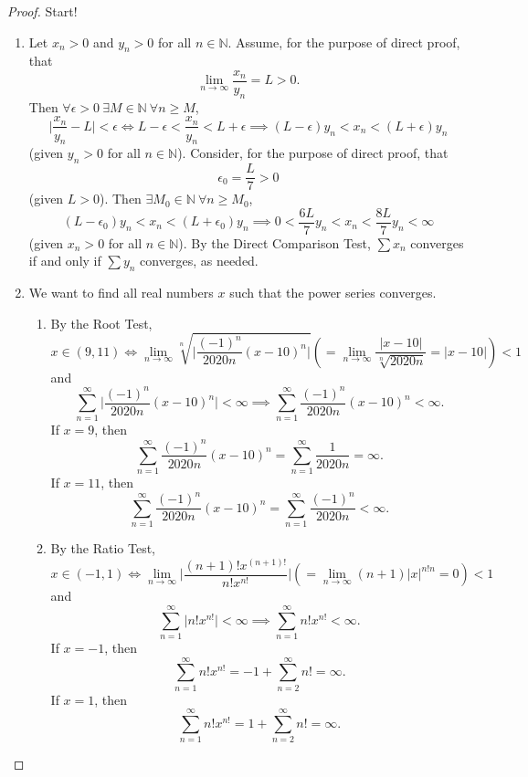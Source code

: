 \documentclass[12pt]{article}
\theoremstyle{definition}
\begin{document}
\begin{proof}
    Start!
    \begin{enumerate}[label=(\alph*)]
        \item Let \(x_n > 0\) and \(y_n > 0\) for all \(n \in \mathbb{N}\). Assume, for the purpose of direct proof, that
        \[
            \lim_{n \to \infty}\frac{x_n}{y_n} = L > 0.
        \]
        Then \(\forall \epsilon > 0 \ \exists M \in \mathbb{N} \ \forall n \geq M\),
        \[
            \bigg\vert \frac{x_n}{y_n} - L \bigg\vert < \epsilon \iff L - \epsilon < \frac{x_n}{y_n} < L + \epsilon \implies (L - \epsilon)y_n < x_n < (L + \epsilon)y_n
        \]
        (given \(y_n > 0\) for all \(n \in \mathbb{N}\)). Consider, for the purpose of direct proof, that
        \[
            \epsilon_0 = \frac{L}{7} > 0
        \]
        (given \(L > 0\)). Then \(\exists M_0 \in \mathbb{N} \ \forall n \geq M_0\),
        \[
            (L - \epsilon_0)y_n < x_n < (L + \epsilon_0)y_n \implies 0 < \frac{6L}{7}y_n < x_n < \frac{8L}{7}y_n < \infty
        \]
        (given \(x_n > 0\) for all \(n \in \mathbb{N}\)). By the Direct Comparison Test, \(\sum x_n\) converges if and only if \(\sum y_n\) converges, as needed.
        \item We want to find all real numbers \(x\) such that the power series converges.
        \begin{enumerate}[label=(\roman*)]
            \item By the Root Test,
            \[
                x \in (9,11) \iff \lim_{n \to \infty}\sqrt[n]{\bigg\vert \frac{(-1)^n}{2020n}(x - 10)^n \bigg\vert} \left( = \lim_{n \to \infty}\frac{\vert x - 10 \vert}{\sqrt[n]{2020n}} = \vert x - 10 \vert \right) < 1
            \]
            and
            \[
                \sum_{n = 1}^{\infty}\bigg\vert \frac{(-1)^n}{2020n}(x - 10)^n \bigg\vert < \infty \implies \sum_{n = 1}^{\infty}\frac{(-1)^n}{2020n}(x - 10)^n < \infty.
            \]
            If \(x = 9\), then
            \[
                \sum_{n = 1}^{\infty}\frac{(-1)^n}{2020n}(x - 10)^n = \sum_{n = 1}^{\infty}\frac{1}{2020n} = \infty.
            \]
            If \(x = 11\), then
            \[
                \sum_{n = 1}^{\infty}\frac{(-1)^n}{2020n}(x - 10)^n = \sum_{n = 1}^{\infty}\frac{(-1)^n}{2020n} < \infty.
            \]
            \item By the Ratio Test,
            \[
                x \in (-1,1) \iff \lim_{n \to \infty}\bigg\vert \frac{(n +1)!x^{(n + 1)!}}{n!x^{n!}} \bigg\vert \left( = \lim_{n \to \infty}(n + 1)\vert x \vert^{n!n} = 0 \right) < 1
            \]
            and
            \[
                \sum_{n = 1}^{\infty}\vert n!x^{n!} \vert < \infty \implies \sum_{n = 1}^{\infty}n!x^{n!} <\infty. 
            \]
            If \(x = -1\), then
            \[
                \sum_{n = 1}^{\infty}n!x^{n!} = -1 + \sum_{n = 2}^{\infty}n! = \infty.
            \]
            If \(x = 1\), then
            \[
                \sum_{n = 1}^{\infty}n!x^{n!} = 1 + \sum_{n = 2}^{\infty}n! = \infty.
            \]
        \end{enumerate}
    \end{enumerate}
\end{proof}
\end{document}
